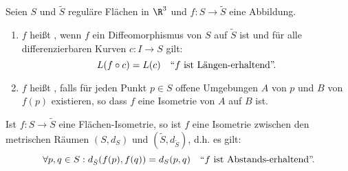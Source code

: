 \begin{definition}
  Seien $ S $ und $ \tilde{S} $ reguläre Flächen in $ \R^3 $ und $ f: S \to \tilde{S} $ eine Abbildung.
  \begin{enumerate}

    \item $ f $ heißt , wenn $ f $ ein Diffeomorphismus von $ S $ auf $ \tilde{S} $ ist und für alle differenzierbaren Kurven $ c: I \to S $ gilt:
    \begin{equation*}
      L(f \circ c) = L(c) \quad \text{``$ f $ ist Längen-erhaltend''.}
    \end{equation*}

    \item $ f $ heißt , falls für jeden Punkt $ p \in S $ offene Umgebungen $ A $ von $ p $ und $ B $ von $ f(p) $ existieren, so dass $ f $ eine Isometrie von $ A $ auf $ B $ ist.
  \end{enumerate}
\end{definition}

\begin{remark}[Abstandserhaltend]
  Ist $ f: S \to \tilde{S} $ eine Flächen-Isometrie, so ist $ f $ eine Isometrie zwischen den metrischen Räumen $ (S, d_S) $ und $ (\tilde{S}, d_{\tilde{S}}) $, d.h. es gilt:
  \begin{equation*}
    \forall p,q \in S : d_{\tilde{S}}(f(p),f(q)) = d_S(p,q) \quad \text{``$ f $ ist Abstands-erhaltend''.}
  \end{equation*}
\end{remark}

